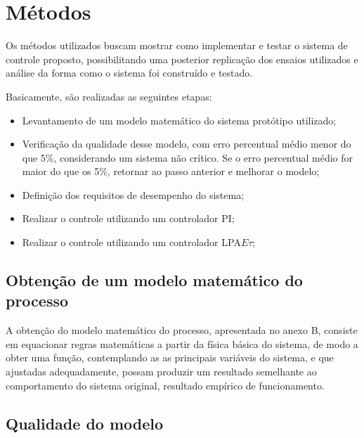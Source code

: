\section{ Métodos }

Os métodos utilizados buscam mostrar como implementar e testar o
sistema de controle proposto, possibilitando uma posterior replicação
dos ensaios utilizados e análise da forma como o sistema foi
construído e testado.


Basicamente, são realizadas as seguintes etapas:

\begin{itemize}
\item Levantamento de um modelo matemático do sistema protótipo utilizado;
\item Verificação da qualidade desse modelo, com erro percentual médio
  menor do que 5\%, considerando um sistema não crítico. Se o erro
  percentual médio for maior do que os 5\%, retornar ao passo anterior e
  melhorar o modelo;
\item Definição dos requisitos de desempenho do sistema;
\item Realizar o controle utilizando um controlador PI;
\item Realizar o controle utilizando um controlador LPA$E\tau$;
\end{itemize}





\subsection{ Obtenção de um modelo matemático do processo }

A obtenção do modelo matemático do processo,
apresentada no anexo B, consiste em equacionar
regras matemáticas a partir da física básica do sistema,
de modo a obter uma função,
contemplando as as principais variáveis do sistema,
e que ajustadas adequadamente,
possam produzir um resultado semelhante ao comportamento do sistema
original, resultado empírico de funcionamento.



\subsection{ Qualidade do modelo }

